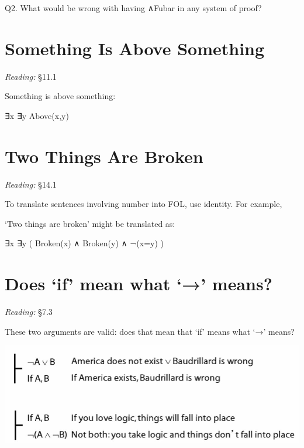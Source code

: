 \documentclass[12pt]{extarticle}
\begin{document}
\begin{multicols*}{3}
\begin{minipage}{\columnwidth}
Q2. What would be wrong with having ∧Fubar in any system of proof?
 
\end{minipage}
 
 
 
\section{Something Is Above Something}
 
\emph{Reading:} §11.1
 
\begin{minipage}{\columnwidth}
 
Something is above something:
 
∃x ∃y Above(x,y)
 
\end{minipage}
 
 
 
\section{Two Things Are Broken}
 
\emph{Reading:} §14.1
 
To translate sentences involving number into FOL, use identity. For example,
 
`Two things are broken' might be translated as:
 
∃x ∃y ( Broken(x) ∧ Broken(y) ∧ ¬(x=y) )
 
 
 
\section{Does ‘if’ mean what ‘→’ means?}
 
\emph{Reading:} §7.3
 
\begin{minipage}{\columnwidth}
 
These two arguments are valid: does that mean that `if' means what `→' means?
 
\begin{center}
\includegraphics[scale=0.3]{img/if_is_arrow.png}
\end{center}
\end{minipage}
 

\end{multicols*}
\end{document}
